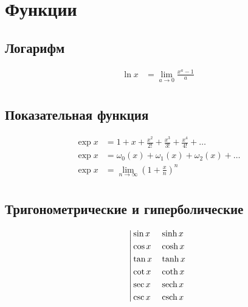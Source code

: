 
\section{Функции}

\subsection{Логарифм}

\begin{equation*} \begin{aligned}
\ln{x} &= \lim_{a \to 0} \frac{x^a - 1}{a} \\
\end{aligned} \end{equation*}

\subsection{Показательная функция}

\begin{equation*}
\begin{aligned}
\exp{x} &= 
  1
+ x
+ \frac{x^2}{2!}
+ \frac{x^3}{3!}
+ \frac{x^4}{4!}
+ \ldots
\\
\exp{x} &=
  \omega_{0}(x)
+ \omega_{1}(x)
+ \omega_{2}(x)
+ \ldots
\\
\exp{x} &=
  \lim_{n \to \infty} \left(
  1 + \frac{x}{n}
  \right)^n
\\
\end{aligned}
\end{equation*}

\subsection{Тригонометрические и гиперболические} %

\begin{equation*}
\left|
\begin{aligned}
&\sin{x} & &\sinh{x} \\
&\cos{x} & &\cosh{x} \\
&\tan{x} & &\tanh{x} \\
&\cot{x} & &\coth{x} \\
&\sec{x} & &\operatorname{sech}{x} \\
&\csc{x} & &\operatorname{csch}{x} \\
\end{aligned}
\right.
\end{equation*}


